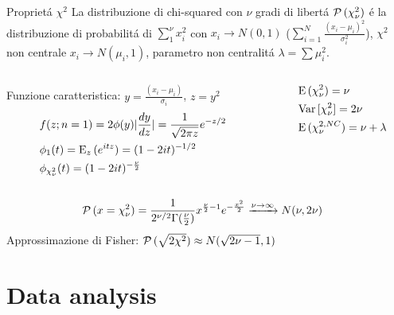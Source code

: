\documentclass[asd-beamer.tex]{subfiles}
\begin{document}
\begin{frame}{Propriet\'a $\chi^2$}
La distribuzione di chi-squared con $\nu$ gradi di libert\'a $\prob{(\chi_{\nu}^2)}$ \'e la distribuzione di probabilit\'a di $\sum_1^{\nu}x_i^2$ con $x_i\to N(0,1)$ ($\sum_{i=1}^N\frac{(x_i-\mu_i)^2}{\sigma_i^2}$), $\chi^2$ non centrale $x_i\to N(\mu_i,1)$, parametro non centralit\'a $\lambda=\sum\mu_i^2$.
\begin{columns}[T]
	\begin{column}{0.7\textwidth}
		Funzione caratteristica: $y=\frac{(x_i-\mu_i)}{\sigma_i}$, $z=y^2$
		\begin{align*}
		&f(z;n=1)=2\phi(y)|\TDy{z}{y}|=\frac{1}{\sqrt{2\pi z}}\exp{-z/2}\\
		&\phi_1(t)=\E_z{(\exp{itz})}=(1-2it)\expy{-1/2}\\
		&\phi_{\chi^2_{\nu}}(t)=(1-2it)\expy{-\frac{\nu}{2}}
		\end{align*}
	\end{column}
	\begin{column}{0.3\textwidth}
		\begin{align*}
		&\E{(\chi^2_{\nu})}=\nu\\
		&\var{[\chi_{\nu}^2]}=2\nu\\
		&\E{(\chi^{2,NC}_{\nu})}=\nu+\lambda
		\end{align*}
	\end{column}
\end{columns}
\begin{align*}
&\prob{(x=\chi^2_{\nu})}=\frac{1}{2\expy{\nu/2}\Gamma(\frac{\nu}{2})}x\expy{\frac{\nu}{2}-1}\exp{-\frac{x^2}{2}}\xrightarrow{\nu\to\infty}N(\nu,2\nu)
\end{align*}
Approssimazione di Fisher: $\prob{(\sqrt{2\chi^2})}\approx N(\sqrt{2\nu-1},1)$
\end{frame}

\section{Data analysis}
\end{document}
